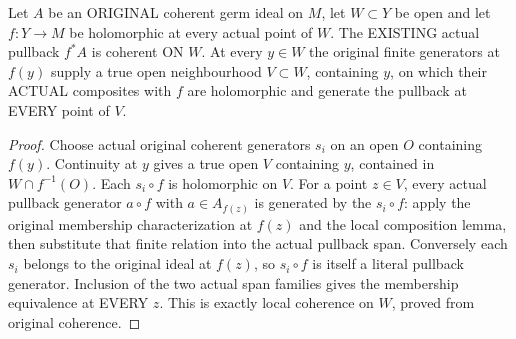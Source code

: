 \begin{theorem}
\label{hir:real-centre-domain-original-pullback-coherence}
\leanok
Let $A$ be an ORIGINAL coherent germ ideal on $M$, let $W\subset Y$ be
open and let $f:Y\to M$ be holomorphic at every actual point of $W$.
The EXISTING actual pullback $f^*A$ is coherent ON $W$. At every $y\in W$
the original finite generators at $f(y)$ supply a true open neighbourhood
$V\subset W$, containing $y$, on which their ACTUAL composites with $f$
are holomorphic and generate the pullback at EVERY point of $V$.
\end{theorem}
\begin{proof}
Choose actual original coherent generators $s_i$ on an open $O$ containing
$f(y)$. Continuity at $y$ gives a true open $V$ containing $y$, contained
in $W\cap f^{-1}(O)$. Each $s_i\circ f$ is holomorphic on $V$. For a
point $z\in V$, every actual pullback generator $a\circ f$ with
$a\in A_{f(z)}$ is generated by the $s_i\circ f$: apply the original
membership characterization at $f(z)$ and the local composition lemma,
then substitute that finite relation into the actual pullback span.
Conversely each $s_i$ belongs to the original ideal at $f(z)$, so
$s_i\circ f$ is itself a literal pullback generator. Inclusion of the
two actual span families gives the membership equivalence at EVERY $z$.
This is exactly local coherence on $W$, proved from original coherence.
\end{proof}

